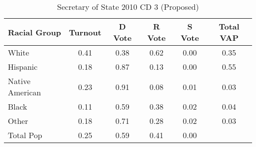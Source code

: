\begin{table}[htb]
\begin{center}
\caption{Secretary of State 2010 CD 3 (Proposed)}
\label{sos10_vap_cd_3}
\begin{tabular}{lccccc}
  \hline
Racial Group & Turnout & D Vote & R Vote & S Vote & Total VAP \\ 
  \hline
White & 0.41 & 0.38 & 0.62 & 0.00 & 0.35 \\ 
  Hispanic & 0.18 & 0.87 & 0.13 & 0.00 & 0.55 \\ 
  Native American & 0.23 & 0.91 & 0.08 & 0.01 & 0.03 \\ 
  Black & 0.11 & 0.59 & 0.38 & 0.02 & 0.04 \\ 
  Other & 0.18 & 0.71 & 0.28 & 0.02 & 0.03 \\ 
  Total Pop & 0.25 & 0.59 & 0.41 & 0.00 &  \\ 
   \hline
\end{tabular}
\end{center}
\end{table}
